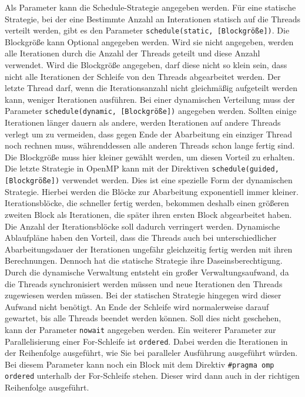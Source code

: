 \documentclass[../main.tex]{subfiles}
\begin{document}
Als Parameter kann die Schedule-Strategie angegeben werden. Für eine statische Strategie, bei der eine Bestimmte Anzahl an Interationen statisch auf die Threads verteilt werden, gibt es den Parameter \texttt{schedule(static, [Blockgröße])}. Die Blockgröße kann Optional angegeben werden. Wird sie nicht angegeben, werden alle Iterationen durch die Anzahl der Threads geteilt und diese Anzahl verwendet. Wird die Blockgröße angegeben, darf diese nicht so klein sein, dass nicht alle Iterationen der Schleife von den Threads abgearbeitet werden. Der letzte Thread darf, wenn die Iterationsanzahl nicht gleichmäßig aufgeteilt werden kann, weniger Iterationen ausführen.
Bei einer dynamischen Verteilung muss der Parameter \texttt{schedule(dynamic, [Blockgröße])} angegeben werden. Sollten einige Iterationen länger dauern als andere, werden Iterationen auf andere Threads verlegt um zu vermeiden, dass gegen Ende der Abarbeitung ein einziger Thread noch rechnen muss, währenddessen alle anderen Threads schon lange fertig sind. Die Blockgröße muss hier kleiner gewählt werden, um diesen Vorteil zu erhalten.
Die letzte Strategie in OpenMP kann mit der Direktiven \texttt{schedule(guided, [Blockgröße])} verwendet werden. Dies ist eine spezielle Form der dynamischen Strategie. Hierbei werden die Blöcke zur Abarbeitung exponentiell immer kleiner. Iterationsblöcke, die schneller fertig werden, bekommen deshalb einen größeren zweiten Block als Iterationen, die später ihren ersten Block abgearbeitet haben. Die Anzahl der Iterationsblöcke soll dadurch verringert werden.
Dynamische Ablaufpläne haben den Vorteil, dass die Threads auch bei unterschiedlicher Abarbeitungsdauer der Iterationen ungefähr gleichzeitig fertig werden mit ihren Berechnungen. Dennoch hat die statische Strategie ihre Daseinsberechtigung. Durch die dynamische Verwaltung entsteht ein großer Verwaltungsaufwand, da die Threads synchronisiert werden müssen und neue Iterationen den Threads zugewiesen werden müssen. Bei der statischen Strategie hingegen wird dieser Aufwand nicht benötigt.
An Ende der Schleife wird normalerweise darauf gewartet, bis alle Threads beendet werden können. Soll dies nicht geschehen, kann der Parameter \texttt{nowait} angegeben werden.
Ein weiterer Parameter zur Parallelisierung einer For-Schleife ist \texttt{ordered}. Dabei werden die Iterationen in der Reihenfolge ausgeführt, wie Sie bei paralleler Ausführung ausgeführt würden. Bei diesem Parameter kann noch ein Block mit dem Direktiv \texttt{\#pragma omp ordered} unterhalb der For-Schleife stehen. Dieser wird dann auch in der richtigen Reihenfolge ausgeführt.
\end{document}
